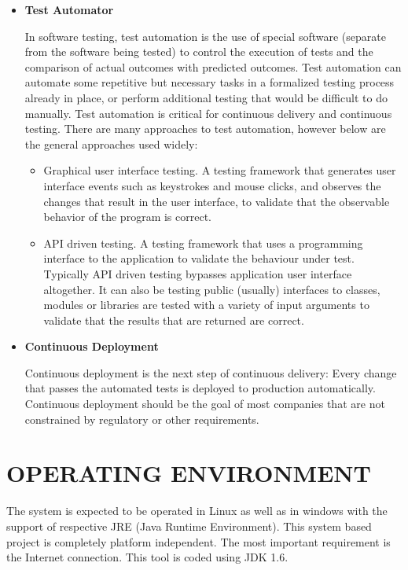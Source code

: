\documentclass[12pt,a4paper,oneside]{report}
\begin{document}
{\begin{itemize}
 \item  \textbf{Test Automator}
\par In software testing, test automation is the use of special software (separate from the software being tested) to control the execution of tests and the comparison of actual outcomes with predicted outcomes. Test automation can automate some repetitive but necessary tasks in a formalized testing process already in place, or perform additional testing that would be difficult to do manually. Test automation is critical for continuous delivery and continuous testing. There are many approaches to test automation, however below are the general approaches used widely:

\begin{itemize}
\item Graphical user interface testing. A testing framework that generates user interface events such as keystrokes and mouse clicks, and observes the changes that result in the user interface, to validate that the observable behavior of the program is correct.
\item API driven testing. A testing framework that uses a programming interface to the application to validate the behaviour under test. Typically API driven testing bypasses application user interface altogether. It can also be testing public (usually) interfaces to classes, modules or libraries are tested with a variety of input arguments to validate that the results that are returned are correct.
\end{itemize}


\item \textbf{Continuous Deployment}
\par Continuous deployment is the next step of continuous delivery: Every change that passes the automated tests is deployed to production automatically. Continuous deployment should be the goal of most companies that are not constrained by regulatory or other requirements.

\end{itemize}

 
\section{OPERATING ENVIRONMENT}
The system is expected to be operated in Linux as well as in windows with the support of
respective JRE (Java Runtime Environment). This system based project is completely platform
independent. The most important requirement is the Internet connection. This tool is coded
using JDK 1.6.
}
\end{document}

